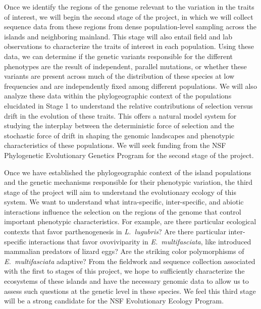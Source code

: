 Once we identify the regions of the genome relevant to the variation in the
traits of interest, we will begin the second stage of the project, in which we
will collect sequence data from these regions from dense population-level
sampling across the islands and neighboring mainland.
This stage will also entail field and lab observations to characterize the
traits of interest in each population.
Using these data, we can determine if the genetic variants responsible for the
different phenotypes are the result of independent, parallel mutations, or
whether these variants are present across much of the distribution of these
species at low frequencies and are independently fixed among different
populations.
We will also analyze these data within the phylogeographic context of the
populations elucidated in Stage 1 to understand the relative contributions of
selection versus drift in the evolution of these traits.
This offers a natural model system for studying the interplay between the
deterministic force of selection and the stochastic force of drift in shaping
the genomic landscapes and phenotypic characteristics of these populations.
We will seek funding from the NSF Phylogenetic Evolutionary Genetics Program
for the second stage of the project.

Once we have established the phylogeographic context of the island populations
and the genetic mechanisms responsible for their phenotypic variation, the
third stage of the project will aim to understand the evolutionary ecology of
this system.
We want to understand what intra-specific, inter-specific, and abiotic
interactions influence the selection on the regions of the genome that control
important phenotypic characteristics.
For example, are there particular ecological contexts that favor
parthenogenesis in \emph{L.\ lugubris}?
Are there particular inter-specific interactions that favor ovoviviparity in
\emph{E.\ multifasciata}, like introduced mammalian predators of lizard eggs?
Are the striking color polymorphisms of \emph{E.\ multifasciata} adaptive?
From the fieldwork and sequence collection associated with the first to stages
of this project, we hope to sufficiently characterize the ecosystems of these
islands and have the necessary genomic data to allow us to assess such
questions at the genetic level in these species.
We feel this third stage will be a strong candidate for the NSF Evolutionary
Ecology Program.

